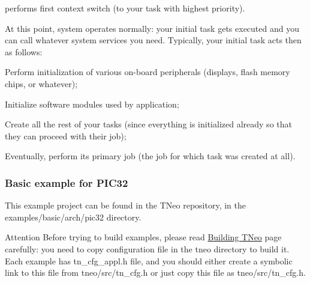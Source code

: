 \begin{DoxyItemize}
\begin{DoxyItemize}
\item performs first context switch (to your task with highest priority).
\end{DoxyItemize}
\item At this point, system operates normally\+: your initial task gets executed and you can call whatever system services you need. Typically, your initial task acts then as follows\+:
\begin{DoxyItemize}
\item Perform initialization of various on-\/board peripherals (displays, flash memory chips, or whatever);
\item Initialize software modules used by application;
\item Create all the rest of your tasks (since everything is initialized already so that they can proceed with their job);
\item Eventually, perform its primary job (the job for which task was created at all).
\end{DoxyItemize}
\end{DoxyItemize}

\subsubsection*{Basic example for P\+I\+C32}

This example project can be found in the T\+Neo repository, in the {\ttfamily examples/basic/arch/pic32} directory.

\begin{DoxyAttention}{Attention}
Before trying to build examples, please read \hyperlink{building}{Building T\+Neo} page carefully\+: you need to copy configuration file in the tneo directory to build it. Each example has {\ttfamily tn\+\_\+cfg\+\_\+appl.\+h} file, and you should either create a symbolic link to this file from {\ttfamily tneo/src/tn\+\_\+cfg.\+h} or just copy this file as {\ttfamily tneo/src/tn\+\_\+cfg.\+h}.
\end{DoxyAttention}

